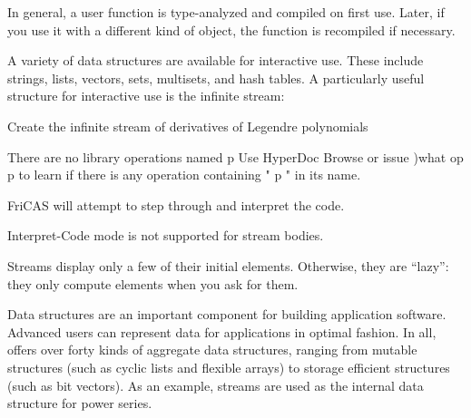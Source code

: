 In general, a user function is type-analyzed and compiled on first use.
Later, if you use it with a different kind of object, the function
is recompiled if necessary.


A variety of data structures are available for interactive use.
These include strings, lists, vectors, sets, multisets, and hash
tables.
A particularly useful structure for interactive use is the
infinite stream:

%
\begin{xtc}
\begin{xtccomment}
Create the infinite stream of derivatives of Legendre
polynomials
\end{xtccomment}
\begin{spadsrc}
[D(p(i),x) for i in 1..]
\end{spadsrc}
\begin{MessageOutput}
   There are no library operations named p 
      Use HyperDoc Browse or issue
                                 )what op p
      to learn if there is any operation containing " p " in its name.
\end{MessageOutput}
\begin{MessageOutput}
   FriCAS will attempt to step through and interpret the code.
\end{MessageOutput}
\begin{MessageOutput}
   Interpret-Code mode is not supported for stream bodies.
\end{MessageOutput}
\end{xtc}

Streams display only a few of their initial elements.
Otherwise, they are ``lazy'': they
only compute elements when you ask for them.

Data structures are an important component for building
application software. Advanced users can
represent data for applications in optimal fashion.
In all, \Language{} offers
over forty kinds of aggregate data structures, ranging
from mutable structures (such as cyclic lists and flexible arrays) to
storage efficient structures (such as bit vectors).
As an example, streams are used as the internal data structure
for power series.

